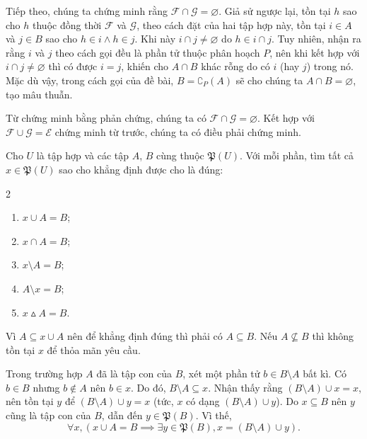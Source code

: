 Tiếp theo, chúng ta chứng minh rằng $\mathscr{F} \cap \mathscr{G} = \varnothing$. Giả sử ngược lại, tồn tại $h$ sao cho $h$ thuộc đồng thời $\mathscr{F}$ và $\mathscr{G}$, theo cách đặt của hai tập hợp này, tồn tại $i \in A$ và $j \in B$ sao cho $h \in i \land h \in j$. Khi này $i \cap j \neq \varnothing$ do $h \in i \cap j$. Tuy nhiên, nhận ra rằng $i$ và $j$ theo cách gọi đều là phần tử thuộc phân hoạch $P$, nên khi kết hợp với $i \cap j \neq \varnothing$ thì có được $i = j$, khiến cho $A \cap B$ khác rỗng do có $i$ (hay $j$) trong nó. Mặc dù vậy, trong cách gọi của đề bài, $B = \complement_P(A)$ sẽ cho chúng ta $A \cap B = \varnothing$, tạo mâu thuẫn. 

Từ chứng minh bằng phản chứng, chúng ta có $\mathscr{F} \cap \mathscr{G} = \varnothing$. Kết hợp với $\mathscr{F} \cup \mathscr{G} = \mathscr{E}$ chứng minh từ trước, chúng ta có điều phải chứng minh.

\exercise Cho $U$ là tập hợp và các tập $A$, $B$ cùng thuộc $\mathfrak{P}(U)$. Với mỗi phần, tìm tất cả $x \in \mathfrak{P}(U)$ sao cho khẳng định được cho là đúng:
\begin{multicols}{2}
   \begin{enumerate}
      \item $x \cup A = B$;
      \item $x \cap A = B$;
      \item $x \setminus A = B$;
      \item $A \setminus x = B$;
      \item $x \vartriangle A = B$.
   \end{enumerate}
\end{multicols}

\solution

\resetSubexercise Vì $A \subseteq x \cup A$ nên để khẳng định đúng thì phải có $A \subseteq B$. Nếu $A \nsubseteq B$ thì không tồn tại $x$ để thỏa mãn yêu cầu.

Trong trường hợp $A$ đã là tập con của $B$, xét một phần tử $b \in B \setminus A$ bất kì. Có $b \in B$ nhưng $b \notin A$ nên $b \in x$. Do đó, $B \setminus A \subseteq x$. Nhận thấy rằng $(B \setminus A) \cup x = x$, nên tồn tại $y$ để $(B \setminus A) \cup y = x$ (tức, $x$ có dạng $(B \setminus A) \cup y$). Do $x \subseteq B$ nên $y$ cũng là tập con của $B$, dẫn đến $y \in \mathfrak{P}(B)$. Vì thế, \begin{equation*}
   \forall x, \left(x \cup A = B \implies \exists y \in \mathfrak{P}(B), x = (B \setminus A) \cup y\right).
\end{equation*}

